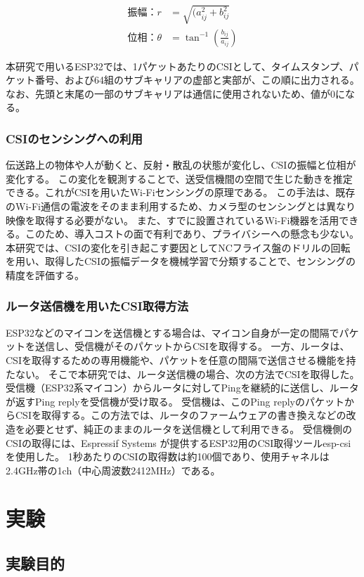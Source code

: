 \documentclass[uplatex, 12pt]{ujbook}
\begin{document}
\begin{align}
振幅：r &= \sqrt{(a_{ij}^2 + b_{ij}^2}\\
位相：\theta &= \tan^{-1}\left(\frac{b_{ij}}{a_{ij}}\right)
\end{align}

本研究で用いるESP32では、1パケットあたりのCSIとして、タイムスタンプ、パケット番号、および64組のサブキャリアの虚部と実部が、この順に出力される。なお、先頭と末尾の一部のサブキャリアは通信に使用されないため、値が0になる。
\subsection{CSIのセンシングへの利用}
伝送路上の物体や人が動くと、反射・散乱の状態が変化し、CSIの振幅と位相が変化する。
この変化を観測することで、送受信機間の空間で生じた動きを推定できる。これがCSIを用いたWi-Fiセンシングの原理である。
この手法は、既存のWi-Fi通信の電波をそのまま利用するため、カメラ型のセンシングとは異なり映像を取得する必要がない。
また、すでに設置されているWi-Fi機器を活用できる。このため、導入コストの面で有利であり、プライバシーへの懸念も少ない。
本研究では、CSIの変化を引き起こす要因としてNCフライス盤のドリルの回転を用い、取得したCSIの振幅データを機械学習で分類することで、センシングの精度を評価する。

\subsection{ルータ送信機を用いたCSI取得方法}
ESP32などのマイコンを送信機とする場合は、マイコン自身が一定の間隔でパケットを送信し、受信機がそのパケットからCSIを取得する。
一方、ルータは、CSIを取得するための専用機能や、パケットを任意の間隔で送信させる機能を持たない。
そこで本研究では、ルータ送信機の場合、次の方法でCSIを取得した。
受信機（ESP32系マイコン）からルータに対してPingを継続的に送信し、ルータが返すPing replyを受信機が受け取る。
受信機は、このPing replyのパケットからCSIを取得する。この方法では、ルータのファームウェアの書き換えなどの改造を必要とせず、純正のままのルータを送信機として利用できる。
受信機側のCSIの取得には、Espressif Systems が提供するESP32用のCSI取得ツールesp-csi を使用した。
1秒あたりのCSIの取得数は約100個であり、使用チャネルは2.4GHz帯の1ch（中心周波数2412MHz）である。

\chapter{実験}
\section{実験目的}
\end{document}
